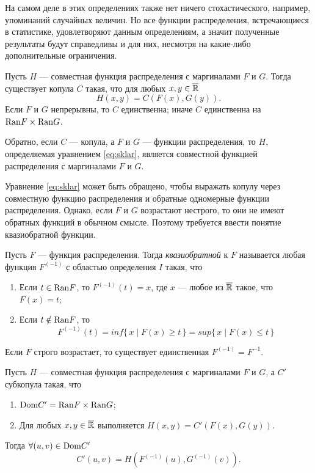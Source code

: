 На самом деле в этих определениях также нет ничего стохастического, например, упоминаний случайных величин. Но все функции распределения, встречающиеся в статистике, удовлетворяют данным определениям, а значит полученные результаты будут справедливы и для них, несмотря на какие-либо дополнительные ограничения.

\begin{theorem}\label{thm:sklar}
	Пусть $H$ --- совместная функция распределения с маргиналами $F$ и $G$. Тогда существует копула $C$ такая, что для любых $x, y \in \overline{\mathbb{R}}$
\begin{equation}\label{eq:sklar}
	H(x, y) = C(F(x), G(y)).
\end{equation}
Если $F$ и $G$ непрерывны, то $C$ единственна; иначе $C$ единственна на $\mathrm{Ran}{F} \times \mathrm{Ran}{G}$.

Обратно, если $C$ --- копула, а $F$ и $G$ --- функции распределения, то $H$, определяемая уравнением \eqref{eq:sklar}, является совместной функцией распределения с маргиналами $F$ и $G$.
\end{theorem}

Уравнение \eqref{eq:sklar} может быть обращено, чтобы выражать копулу через совместную функцию распределения и обратные одномерные функции распределения. Однако, если $F$ и $G$ возрастают нестрого, то они не имеют обратных функций в обычном смысле. Поэтому требуется ввести понятие квазиобратной функции.

\begin{define}
	Пусть $F$ --- функция распределения. Тогда \emph{квазиобратной} к $F$ называется любая функция $F^{(-1)}$ с областью определения $I$ такая, что
	\begin{enumerate}
	\item Если $t \in \mathrm{Ran}{F}$, то $F^{(-1)}(t) = x$, где $x$ --- любое из $\overline{\mathbb{R}}$ такое, что $F(x) = t$;
	\item Если $t \notin \mathrm{Ran}{F}$, то
	\[
	F^{(-1)}(t) = inf \{\, x \mid F(x) \geqslant t \,\} = sup \{\, x \mid F(x) \leqslant t \,\}
	\]
	\end{enumerate}
\end{define}
Если $F$ строго возрастает, то существует единственная $F^{(-1)} = F^{-1}$.

\begin{theorem}
	Пусть $H$ --- совместная функция распределения с маргиналами $F$ и $G$, а $C'$ субкопула такая, что
	\begin{enumerate}
	\item $\mathrm{Dom}{C'} = \mathrm{Ran}{F} \times \mathrm{Ran}{G}$;
	\item Для любых $x, y \in \overline{\mathbb{R}}$ выполняется $H(x, y) = C'(F(x), G(y))$.
	\end{enumerate}
Тогда $\forall (u, v) \in \mathrm{Dom}{C'}$
\[
C'(u, v) = H(F^{(-1)}(u), G^{(-1)}(v)).
\]
\end{theorem}

